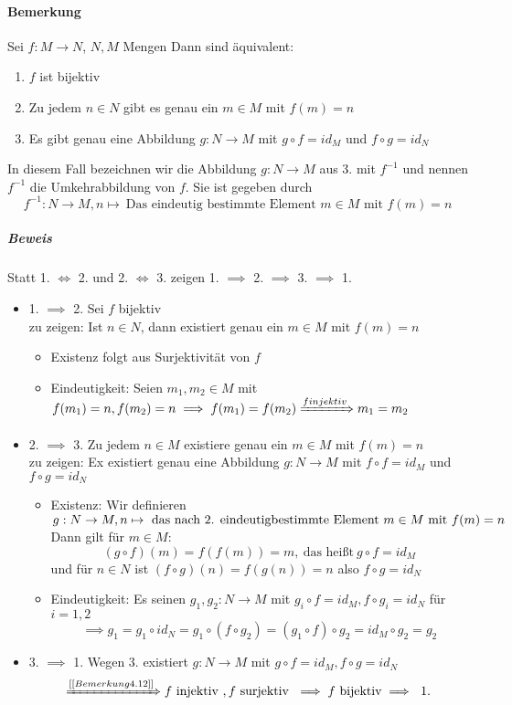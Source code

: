 \documentclass[a4paper]{scrartcl}
\theoremstyle{definition}
\theoremstyle{plain}
\theoremstyle{plain}
\theoremstyle{remark}
\theoremstyle{remark}
\theoremstyle{remark}
\theoremstyle{remark}
\theoremstyle{remark}
\begin{document}
\paragraph{Bemerkung}
\label{sec-2-6-7-6}
Sei $f:M\to N$, $N,M$ Mengen
Dann sind äquivalent:
\begin{enumerate}
\item $f$ ist bijektiv
\item Zu jedem $n\in N$ gibt es genau ein $m\in M$ mit $f(m) = n$
\item Es gibt genau eine Abbildung $g:N\to M$ mit $g\circ f = id_M$ und $f\circ g = id_N$
\end{enumerate}
In diesem Fall bezeichnen wir die Abbildung $g:N\to M$ aus 3. mit $f^{-1}$ und nennen $f^{-1}$ die Umkehrabbildung von $f$. Sie ist gegeben durch
\[f^{-1} : N\to M, n\mapsto~\text{Das eindeutig bestimmte Element $m\in M$ mit $f(m) = n$}\]
\subparagraph{Beweis}
\label{sec-2-6-7-6-1}
Statt 1. $\iff$ 2. und 2. $\iff$ 3. zeigen 1. $\implies$ 2. $\implies$ 3. $\implies$ 1.
\begin{itemize}
\item 1. $\implies$ 2. Sei $f$ bijektiv \\
                zu zeigen: Ist $n\in N$, dann existiert genau ein $m\in M$ mit $f(m) = n$ \\
\begin{itemize}
\item Existenz folgt aus Surjektivität von $f$
\item Eindeutigkeit: Seien $m_1,m_2 \in M$  mit \(f(m_1) = n, f(m_2) = n \implies f(m_1) = f(m_2) \xRightarrow{f injektiv} m_1 = m_2\)
\end{itemize}
\item 2. $\implies$ 3. Zu jedem $n\in M$ existiere genau ein $m\in M$ mit $f(m) = n$ \\
                zu zeigen: Ex existiert genau eine Abbildung $g:N\to M$ mit $f\circ f = id_M$ und $f\circ g = id_N$
\begin{itemize}
\item Existenz: Wir definieren \(g:N\to M, n\mapsto~\text{das nach 2. eindeutig \\
		  bestimmte Element $m\in M$ mit $f(m) = n$}\) \\
Dann gilt für $m\in M$: \[(g\circ f)(m) = f(f(m)) = m,~\text{das heißt}~ g\circ f = id_M\]
und für $n\in N$ ist $(f\circ g)(n) = f(g(n)) = n$ also $f\circ g = id_N$
\item Eindeutigkeit: Es seinen $g_1,g_2:N\to M$ mit $g_i \circ f = id_M, f\circ g_i = id_N$ für $i = 1,2$ \\
                  \[\implies g_1 = g_1 \circ id_N = g_1 \circ (f\circ g_2) = (g_1 \circ f) \circ g_2 = id_M \circ g_2 = g_2\]
\end{itemize}
\item 3. $\implies$ 1. Wegen 3. existiert $g:N\to M$ mit $g\circ f = id_M,f\circ g = id_N$ \\
                \[\xRightarrow{[[Bemerkung 4.12]]} f~\text{injektiv}~,f~\text{surjektiv}~\implies f~\text{bijektiv}\implies~\text{1.}\]
\end{itemize}
\end{document}
